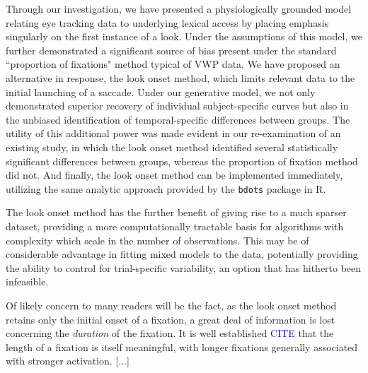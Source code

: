 \documentclass{article}
\newcommand{\xt}{\texttt}
\providecommand{\cn}[1]{\textcolor{blue}{#1}}
\begin{document}
Through our investigation, we have presented a physiologically grounded model relating eye tracking data to underlying lexical access by placing emphasis singularly on the first instance of a look. Under the assumptions of this model, we further demonstrated a significant source of bias present under the standard ``proportion of fixations" method typical of VWP data. We have proposed an alternative in response, the look onset method, which limits relevant data to the initial launching of a saccade. Under our generative model, we not only demonstrated superior recovery of individual subject-specific curves but also in the unbiased identification of temporal-specific differences between groups. The utility of this additional power was made evident in our re-examination of an existing study, in which the look onset method identified several statistically significant differences between groups, whereas the proportion of fixation method did not. And finally, the look onset method can be implemented immediately, utilizing the same analytic approach provided by the \xt{bdots} package in R.

The look onset method has the further benefit of giving rise to a much sparser dataset, providing a more computationally tractable basis for algorithms with complexity which scale in the number of observations. This may be of considerable advantage in fitting mixed models to the data, potentially providing the ability to control for trial-specific variability, an option that has hitherto been infeasible. 

Of likely concern to many readers will be the fact, as the look onset method retains only the initial onset of a fixation, a great deal of information is lost concerning the \textit{duration} of the fixation. It is well established \cn{CITE} that the length of a fixation is itself meaningful, with longer fixations generally associated with stronger activation. [...]
\end{document}
